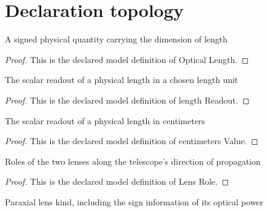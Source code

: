 \section{Declaration topology}
\begin{definition}
  \label{def:physics:phyx-mini-0111:phyxminiproblems-problemphyxmini0111-opticallength}
  A signed physical quantity carrying the dimension of length
\end{definition}
\begin{proof}
  This is the declared model definition of Optical Length.
\end{proof}
\begin{definition}
  \label{def:physics:phyx-mini-0111:phyxminiproblems-problemphyxmini0111-lengthreadout}
  The scalar readout of a physical length in a chosen length unit
\end{definition}
\begin{proof}
  This is the declared model definition of length Readout.
\end{proof}
\begin{definition}
  \label{def:physics:phyx-mini-0111:phyxminiproblems-problemphyxmini0111-centimetersvalue}
  The scalar readout of a physical length in centimeters
\end{definition}
\begin{proof}
  This is the declared model definition of centimeters Value.
\end{proof}
\begin{definition}
  \label{def:physics:phyx-mini-0111:phyxminiproblems-problemphyxmini0111-lensrole}
  Roles of the two lenses along the telescope's direction of propagation
\end{definition}
\begin{proof}
  This is the declared model definition of Lens Role.
\end{proof}
\begin{definition}
  \label{def:physics:phyx-mini-0111:phyxminiproblems-problemphyxmini0111-thinlenskind}
  Paraxial lens kind, including the sign information of its optical power
\end{definition}

